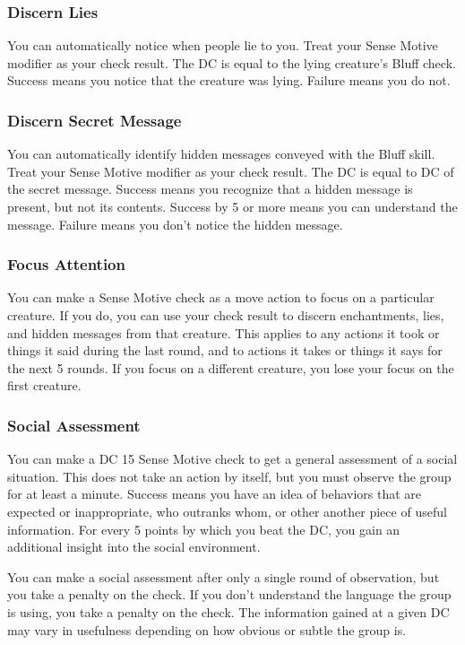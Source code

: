 \subsubsection{Discern Lies}
You can automatically notice when people lie to you. Treat your Sense Motive modifier as your check result. The DC is equal to the lying creature's Bluff check. Success means you notice that the creature was lying. Failure means you do not.

\subsubsection{Discern Secret Message}
You can automatically identify hidden messages conveyed with the Bluff skill. Treat your Sense Motive modifier as your check result. The DC is equal to DC of the secret message. Success means you recognize that a hidden message is present, but not its contents. Success by 5 or more means you can understand the message. Failure means you don't notice the hidden message.

\subsubsection{Focus Attention}
You can make a Sense Motive check as a move action to focus on a particular creature. If you do, you can use your check result to discern enchantments, lies, and hidden messages from that creature. This applies to any actions it took or things it said during the last round, and to actions it takes or things it says for the next 5 rounds. If you focus on a different creature, you lose your focus on the first creature.

\subsubsection{Social Assessment}
You can make a DC 15 Sense Motive check to get a general assessment of a social situation. This does not take an action by itself, but you must observe the group for at least a minute. Success means you have an idea of behaviors that are expected or inappropriate, who outranks whom, or other another piece of useful information. For every 5 points by which you beat the DC, you gain an additional insight into the social environment.

You can make a social assessment after only a single round of observation, but you take a  penalty on the check. If you don't understand the language the group is using, you take a  penalty on the check. The information gained at a given DC may vary in usefulness depending on how obvious or subtle the group is.

